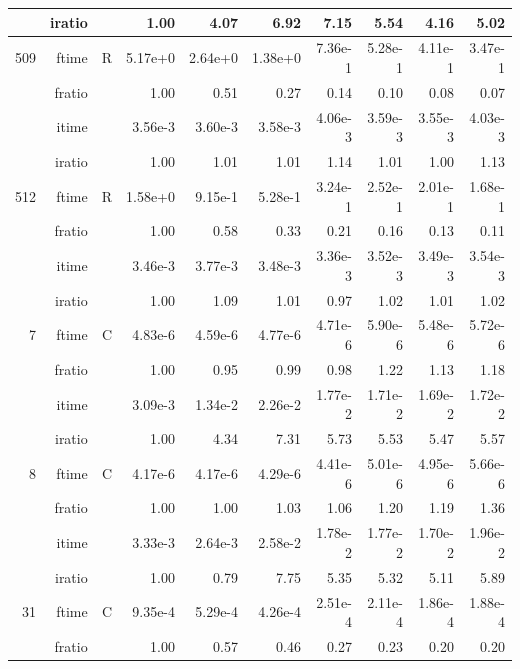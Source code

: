 \documentclass[a4paper]{article}
\begin{document}
\begin{table}
\begin{center}
\begin{tabular}{|r|r|r|r|r|r|r|r|r|r|}
     & iratio & &       1.00 &   4.07 &   6.92 &   7.15 &   5.54 &   4.16 &   5.02     \\ \hline 
  509  & ftime & R  &   5.17e+0 &   2.64e+0 &   1.38e+0 &   7.36e-1 &   5.28e-1 &   4.11e-1 &   3.47e-1   \\ 
      & fratio & &      1.00 &   0.51 &   0.27 &   0.14 &   0.10 &   0.08 &   0.07       \\ 
     & itime & &        3.56e-3 &   3.60e-3 &   3.58e-3 &   4.06e-3 &   3.59e-3 &   3.55e-3 &   4.03e-3      \\ 
     & iratio & &       1.00 &   1.01 &   1.01 &   1.14 &   1.01 &   1.00 &   1.13        \\ \hline 
  512  & ftime & R  &   1.58e+0 &   9.15e-1 &   5.28e-1 &   3.24e-1 &   2.52e-1 &   2.01e-1 &   1.68e-1    \\ 
      & fratio & &      1.00 &   0.58 &   0.33 &   0.21 &   0.16 &   0.13 &   0.11    \\ 
     & itime & &        3.46e-3 &   3.77e-3 &   3.48e-3 &   3.36e-3 &   3.52e-3 &   3.49e-3 &   3.54e-3       \\ 
     & iratio & &       1.00 &   1.09 &   1.01 &   0.97 &   1.02 &   1.01 &   1.02       \\ \hline \hline
    7  & ftime & C  &   4.83e-6 &   4.59e-6 &   4.77e-6 &   4.71e-6 &   5.90e-6 &   5.48e-6 &   5.72e-6   \\ 
      & fratio & &      1.00 &   0.95 &   0.99 &   0.98 &   1.22 &   1.13 &   1.18    \\ 
     & itime & &        3.09e-3 &   1.34e-2 &   2.26e-2 &   1.77e-2 &   1.71e-2 &   1.69e-2 &   1.72e-2     \\ 
     & iratio & &       1.00 &   4.34 &   7.31 &   5.73 &   5.53 &   5.47 &   5.57       \\ \hline 
    8  & ftime & C  &   4.17e-6 &   4.17e-6 &   4.29e-6 &   4.41e-6 &   5.01e-6 &   4.95e-6 &   5.66e-6     \\ 
      & fratio & &      1.00 &   1.00 &   1.03 &   1.06 &   1.20 &   1.19 &   1.36     \\ 
     & itime & &        3.33e-3 &   2.64e-3 &   2.58e-2 &   1.78e-2 &   1.77e-2 &   1.70e-2 &   1.96e-2      \\ 
     & iratio & &       1.00 &   0.79 &   7.75 &   5.35 &   5.32 &   5.11 &   5.89       \\ \hline 
   31  & ftime & C  &   9.35e-4 &   5.29e-4 &   4.26e-4 &   2.51e-4 &   2.11e-4 &   1.86e-4 &   1.88e-4    \\ 
      & fratio & &      1.00 &   0.57 &   0.46 &   0.27 &   0.23 &   0.20 &   0.20     \\ 

\end{tabular}
\end{center}
\end{table}
\end{document}
